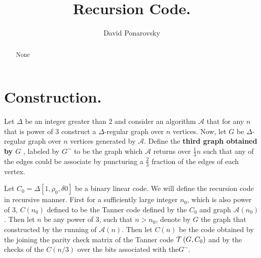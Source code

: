 \documentclass{article}
\begin{document}
\title{Recursion Code.} 
\author{David Ponarovsky}
\maketitle
\begin{abstract}None 
\end{abstract}

\section{Construction.}
\begin{definition} 
  Let $\Delta$ be an integer greater than $2$ and consider an algorithm $\mathcal{A}$ that for any $n$ that is power of $3$ construct a $\Delta$-regular graph over $n$ vertices. Now, let $G$ be $\Delta$-regular graph over $n$ vertices generated by $\mathcal{A}$. Define the \textbf{third graph obtained by $G$ } , labeled by $G^{\sim}$ to be the graph which $\mathcal{A}$ returns over $\frac{1}{3} n$ such that any of the edges could be associate by puncturing a $\frac{2}{3}$ fraction of the edges of each vertex.  
\end{definition}

\begin{definition} Let $C_{0}=\Delta[1,\rho_{0}, \delta{0}]$ be a binary linear code.  We will define the recursion code in recursive manner. First for a sufficiently large integer $n_{0}$, which is also power of $3$, $C\left( n_{0} \right)$ defined to be the Tanner code defined by the $C_{0}$ and graph $\mathcal{A}\left( n_{0} \right)$. Then let $n$ be any power of $3$, such that $n > n_{0}$, denote by $G$ the graph that constructed by the running of $\mathcal{A}\left( n \right)$.  Then let $C\left( n \right)$ be the code obtained by the joining the parity check matrix of the Tanner code $\mathcal{T}\left( G, C_0 \right)$ and by the checks of the $C\left( n / 3 \right)$ over the bits associated with the$G^{\sim}$.     
\end{definition}
\printbibliography 
\end{document}
